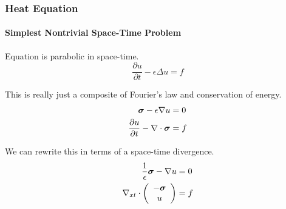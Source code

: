 \documentclass[18pt,xcolor=table]{beamer}
\begin{document}
%                                          
%                                          
%  
\begin{frame}[t]
\frametitle{Heat Equation}
\framesubtitle{Simplest Nontrivial Space-Time Problem}  %

Equation is parabolic in space-time.
\begin{equation*}
  \frac{\partial u}{\partial t}-\epsilon\Delta u=f
\end{equation*}

This is really just a composite of Fourier's law and conservation of energy.
\begin{equation*}
\begin{aligned}
\boldsymbol\sigma-\epsilon\nabla u&=0\\
\frac{\partial u}{\partial t}-\nabla\cdot\boldsymbol\sigma&=f
\end{aligned}
\end{equation*}

We can rewrite this in terms of a space-time divergence.
\begin{equation*}
\begin{aligned}
\frac{1}{\epsilon}\boldsymbol\sigma-\nabla u&=0\\
\nabla_{xt}\cdot\left( \begin{array}{c} -\boldsymbol\sigma\\ u\\ \end{array} \right)&=f
\end{aligned}
\end{equation*}
\end{frame}

\end{document}
